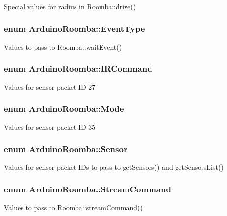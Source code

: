 Special values for radius in Roomba::drive() \hypertarget{class_arduino_roomba_af76e2cc5c85104aae809b49a9af59a9c}{
\subsubsection[{EventType}]{\setlength{\rightskip}{0pt plus 5cm}enum {\bf ArduinoRoomba::EventType}}}
\label{class_arduino_roomba_af76e2cc5c85104aae809b49a9af59a9c}
Values to pass to Roomba::waitEvent() \hypertarget{class_arduino_roomba_a71fa7df913e00d7c92298f8802f9667c}{
\subsubsection[{IRCommand}]{\setlength{\rightskip}{0pt plus 5cm}enum {\bf ArduinoRoomba::IRCommand}}}
\label{class_arduino_roomba_a71fa7df913e00d7c92298f8802f9667c}
Values for sensor packet ID 27 \hypertarget{class_arduino_roomba_aeceb5ee5b7d1b544d70d6223e6e0345c}{
\subsubsection[{Mode}]{\setlength{\rightskip}{0pt plus 5cm}enum {\bf ArduinoRoomba::Mode}}}
\label{class_arduino_roomba_aeceb5ee5b7d1b544d70d6223e6e0345c}
Values for sensor packet ID 35 \hypertarget{class_arduino_roomba_afa21b9beadec65f3d9ef5e2f7a8fe469}{
\subsubsection[{Sensor}]{\setlength{\rightskip}{0pt plus 5cm}enum {\bf ArduinoRoomba::Sensor}}}
\label{class_arduino_roomba_afa21b9beadec65f3d9ef5e2f7a8fe469}
Values for sensor packet IDs to pass to getSensors() and getSensorsList() \hypertarget{class_arduino_roomba_a80ef89fefa26336ed641673662ef4b6b}{
\subsubsection[{StreamCommand}]{\setlength{\rightskip}{0pt plus 5cm}enum {\bf ArduinoRoomba::StreamCommand}}}
\label{class_arduino_roomba_a80ef89fefa26336ed641673662ef4b6b}
Values to pass to Roomba::streamCommand() 

